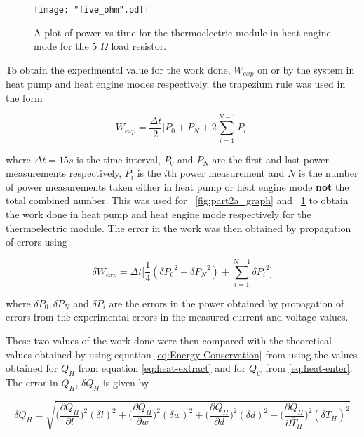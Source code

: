 \documentclass{article}
\newcommand{\figref}[2][\figurename~]{#1\ref{#2}}
\begin{document}
\begin{figure}[h]
\centering
\texttt{[image: "five\_ohm".pdf]}
\caption{A plot of power vs time for the thermoelectric module in heat engine mode for the 5 $\Omega$ load resistor.}
\label{fig:part2b_graph}
\end{figure}

\newpage
\vspace{2mm}
\noindent
To obtain the experimental value for the work done, $W_{exp}$ on or by the system in heat pump and heat engine modes respectively, the trapezium rule was used in the form

\begin{equation}
\label{eq:trap-rule}
W_{exp} = \frac{\Delta t}{2}\bigg[P_0 + P_N + 2\sum_{i=1}^{N-1} P_i \bigg]
\end{equation}

\vspace{2mm}
\noindent
where $\Delta t = 15s$ is the time interval, $P_0$ and $P_N$ are the first and last power measurements respectively, $P_i$ is the $i$th power measurement and $N$ is the number of power measurements taken either in heat pump or heat engine mode \textbf{not} the total combined number. This was used for \figref{fig:part2a_graph} and \figref{fig:part2b_graph} to obtain the work done in heat pump and heat engine mode respectively for the thermoelectric module. The error in the work was then obtained by propagation of errors using

\begin{equation}
\label{eq:trap-error}
\delta W_{exp} = \Delta t \bigg[\frac{1}{4}(\delta {P_0}^2 + \delta {P_N}^2) + \sum_{i=1}^{N-1} \delta {P_i}^2 \bigg]
\end{equation}

\vspace{2mm}
\noindent
where $\delta P_0, \delta P_N $ and $ \delta P_i$ are the errors in the power obtained by propagation of errors from the experimental errors in the measured current and voltage values.

\vspace{2mm}
\noindent
These two values of the work done were then compared with the theoretical values obtained by using equation \eqref{eq:Energy-Conservation} from using the values obtained for $Q_H$ from equation \eqref{eq:heat-extract} and for $Q_C$ from \eqref{eq:heat-enter}. The error in $Q_H$, $\delta Q_H$ is given by

\begin{equation}
\label{eq:heat-error}
\delta Q_H = \sqrt{\bigg(\frac{\partial{Q_H}}{\partial{l}}\bigg)^2(\delta l)^2 + \bigg(\frac{\partial{Q_H}}{\partial{w}}\bigg)^2(\delta w)^2 + \bigg(\frac{\partial{Q_H}}{\partial{d}}\bigg)^2(\delta d)^2 + \bigg(\frac{\partial{Q_H}}{\partial{\overline T_H}}\bigg)^2(\delta \overline T_H)^2}
\end{equation}
\end{document}
